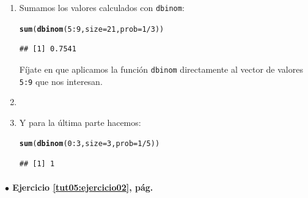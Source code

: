 \documentclass[10pt,a4paper]{article}\usepackage[]{graphicx}\usepackage[]{color}
\makeatletter
\newcommand{\hlnum}[1]{\textcolor[rgb]{0.686,0.059,0.569}{#1}}%
\newcommand{\hlopt}[1]{\textcolor[rgb]{0,0,0}{#1}}%
\newcommand{\hlstd}[1]{\textcolor[rgb]{0.345,0.345,0.345}{#1}}%
\newcommand{\hlkwc}[1]{\textcolor[rgb]{0.333,0.667,0.333}{#1}}%
\newcommand{\hlkwd}[1]{\textcolor[rgb]{0.737,0.353,0.396}{\textbf{#1}}}%
\newenvironment{kframe}{%
 \def\at@end@of@kframe{}%
 \ifinner\ifhmode%
  \def\at@end@of@kframe{\end{minipage}}%
  \begin{minipage}{\columnwidth}%
 \fi\fi%
 \def\FrameCommand##1{\hskip\@totalleftmargin \hskip-\fboxsep
 \colorbox{shadecolor}{##1}\hskip-\fboxsep
     \hskip-\linewidth \hskip-\@totalleftmargin \hskip\columnwidth}%
 \MakeFramed {\advance\hsize-\width
   \@totalleftmargin\z@ \linewidth\hsize
   \@setminipage}}%
 {\par\unskip\endMakeFramed%
 \at@end@of@kframe}
\newenvironment{knitrout}{}{} %
\makeatother
\begin{document}
\begin{enumerate}
  \item Sumamos los valores calculados con {\tt dbinom}:
\begin{knitrout}
\color{fgcolor}\begin{kframe}
\begin{alltt}
\hlkwd{sum}\hlstd{(}\hlkwd{dbinom}\hlstd{(}\hlnum{5}\hlopt{:}\hlnum{9}\hlstd{,} \hlkwc{size}\hlstd{=}\hlnum{21}\hlstd{,} \hlkwc{prob}\hlstd{=}\hlnum{1}\hlopt{/}\hlnum{3}\hlstd{))}
\end{alltt}
\begin{verbatim}
## [1] 0.7541
\end{verbatim}
\end{kframe}
\end{knitrout}
    Fíjate en que aplicamos la función {\tt dbinom} directamente al vector de valores {\tt 5:9} que nos interesan.


  \item \item Y para la última parte hacemos:
\begin{knitrout}
\color{fgcolor}\begin{kframe}
\begin{alltt}
\hlkwd{sum}\hlstd{(}\hlkwd{dbinom}\hlstd{(}\hlnum{0}\hlopt{:}\hlnum{3}\hlstd{,} \hlkwc{size}\hlstd{=}\hlnum{3}\hlstd{,} \hlkwc{prob}\hlstd{=}\hlnum{1}\hlopt{/}\hlnum{5}\hlstd{))}
\end{alltt}
\begin{verbatim}
## [1] 1
\end{verbatim}
\end{kframe}
\end{knitrout}


\end{enumerate}


\paragraph{\bf $\bullet$ Ejercicio \ref{tut05:ejercicio02}, pág. \pageref{tut05:ejercicio02}}
\label{tut05:ejercicio02:sol}\quad\\
\end{document}
